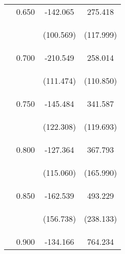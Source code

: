 \begin{tabular}{lccc}
\noalign{\smallskip} & 0.650 & -142.065 & 275.418\\
 & \begin{footnotesize}\end{footnotesize} & \begin{footnotesize}(100.569)\end{footnotesize} & \begin{footnotesize}(117.999)\end{footnotesize}\\
\noalign{\smallskip} & 0.700 & -210.549 & 258.014\\
 & \begin{footnotesize}\end{footnotesize} & \begin{footnotesize}(111.474)\end{footnotesize} & \begin{footnotesize}(110.850)\end{footnotesize}\\
\noalign{\smallskip} & 0.750 & -145.484 & 341.587\\
 & \begin{footnotesize}\end{footnotesize} & \begin{footnotesize}(122.308)\end{footnotesize} & \begin{footnotesize}(119.693)\end{footnotesize}\\
\noalign{\smallskip} & 0.800 & -127.364 & 367.793\\
 & \begin{footnotesize}\end{footnotesize} & \begin{footnotesize}(115.060)\end{footnotesize} & \begin{footnotesize}(165.990)\end{footnotesize}\\
\noalign{\smallskip} & 0.850 & -162.539 & 493.229\\
 & \begin{footnotesize}\end{footnotesize} & \begin{footnotesize}(156.738)\end{footnotesize} & \begin{footnotesize}(238.133)\end{footnotesize}\\
\noalign{\smallskip} & 0.900 & -134.166 & 764.234\\

\end{tabular}
